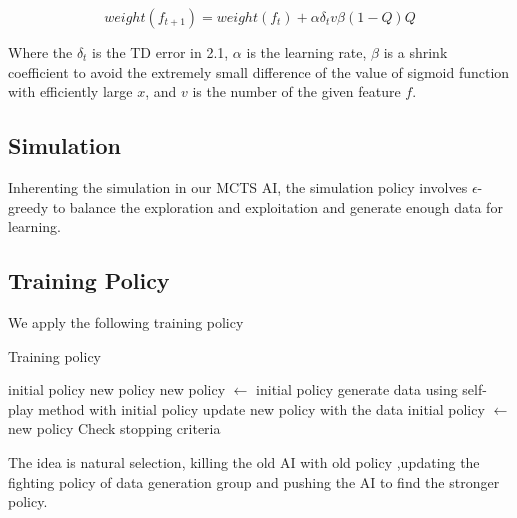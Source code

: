 \documentclass[a4paper, 12pt]{article} %
\begin{document}
\begin{multicols}{2}
		\begin{equation*}
			weight(f_{t + 1}) = weight(f_t) + \alpha \delta_t v \beta (1 - Q)Q
		\end{equation*}
		
		Where the $\delta_t$ is the TD error in 2.1, $\alpha$ is the learning rate, $\beta$ is a shrink coefficient to avoid the extremely small difference of the value of sigmoid function with efficiently large $x$, and $v$ is the number of the given feature $f$.
		
		\subsection{Simulation}
		
		Inherenting the simulation in our MCTS AI, the simulation policy involves $\epsilon$-greedy to balance the exploration and exploitation and generate enough data for learning.
		
		\subsection{Training Policy}
		
		We apply the following training policy
		
		\begin{algorithm}[H]
			\caption{Training policy}
			\begin{algorithmic}[1]
				\Require initial policy
				\Ensure new policy
				\State new policy $\gets$ initial policy
						\State generate data using self-play method with initial policy
						\State update new policy with the data
					\EndWhile
					\State initial policy $\gets$ new policy
					\State Check stopping criteria
				\EndWhile
			\end{algorithmic}
		\end{algorithm}
	
		The idea is natural selection, killing the old AI with old policy ,updating the fighting policy of data generation group and pushing the AI to find the stronger policy.
	\end{multicols}
	
	\newpage
	
\end{document}
